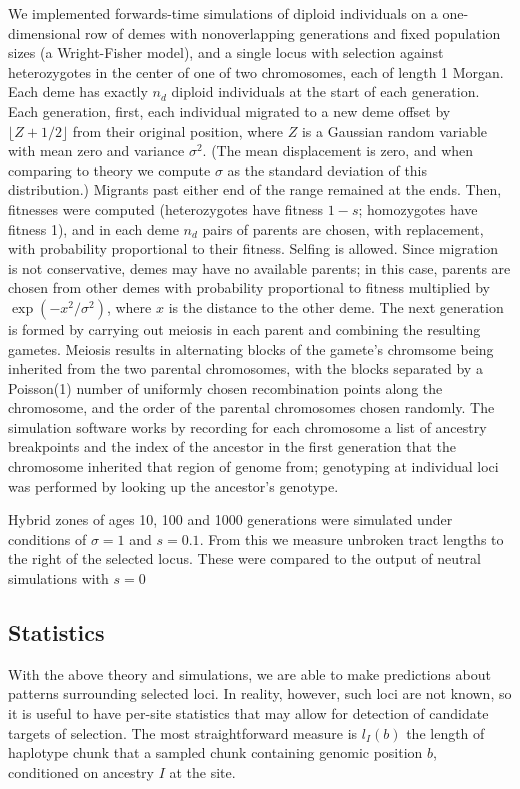 \documentclass[12pt]{article}
\begin{document}
We implemented forwards-time simulations of diploid individuals on a one-dimensional row of demes
with nonoverlapping generations and fixed population sizes (a Wright-Fisher model),
and a single locus with selection against heterozygotes in the center of one of two chromosomes, each of length 1 Morgan.
Each deme has exactly $n_d$ diploid individuals at the start of each generation.
Each generation,
first, each individual migrated to a new deme offset by $\lfloor Z + 1/2 \rfloor$ from their original position,
where $Z$ is a Gaussian random variable with mean zero and variance $\sigma^2$.
(The mean displacement is zero, and when comparing to theory we compute $\sigma$ as the standard deviation of this distribution.)
Migrants past either end of the range remained at the ends.
Then, 
fitnesses were computed (heterozygotes have fitness $1-s$; homozygotes have fitness 1),
and in each deme $n_d$ pairs of parents are chosen, with replacement,
with probability proportional to their fitness.
Selfing is allowed.
Since migration is not conservative, demes may have no available parents;
in this case, parents are chosen from other demes with probability proportional to fitness
multiplied by $\exp(-x^2/\sigma^2)$, where $x$ is the distance to the other deme.
The next generation is formed by carrying out meiosis in each parent
and combining the resulting gametes.
Meiosis results in alternating blocks of the gamete's chromsome
being inherited from the two parental chromosomes,
with the blocks separated by a Poisson(1) number of uniformly chosen recombination points along the chromosome,
and the order of the parental chromosomes chosen randomly.
The simulation software works by recording for each chromosome
a list of ancestry breakpoints and the index of the ancestor in the first generation
that the chromosome inherited that region of genome from;
genotyping at individual loci was performed by looking up the ancestor's genotype.

Hybrid zones of ages 10, 100 and 1000 generations were simulated under conditions of $\sigma=1$ and $s=0.1$. From this we measure unbroken tract lengths to the right of the selected locus. These were compared to the output of neutral simulations with $s=0$


\subsection*{Statistics}
With the above theory and simulations, we are able to make predictions about patterns surrounding selected loci. In reality, however, such loci are not known, so it is useful to have per-site statistics that may allow for detection of candidate targets of selection. The most straightforward measure is $l_I(b)$ the length of haplotype chunk that a sampled chunk containing genomic position $b$, conditioned on ancestry $I$ at the site.
\end{document}
